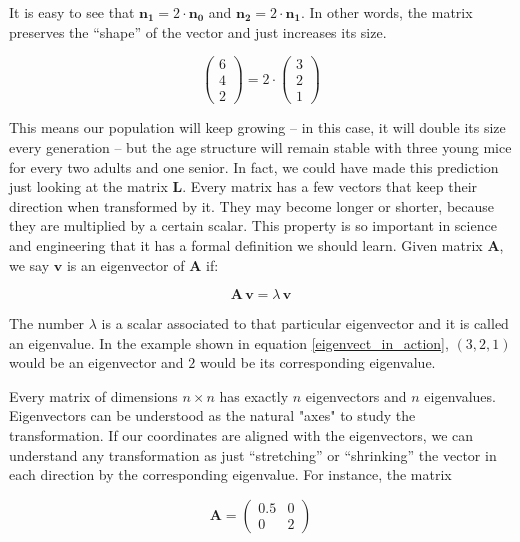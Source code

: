 \documentclass{tufte-book} %
\begin{document}
It is easy to see that $\mathbf{n_1} = 2 \cdot \mathbf{n_0}$  and $\mathbf{n_2} = 2 \cdot \mathbf{n_1}$. In other words, the matrix preserves the ``shape'' of the vector and just increases its size.

\begin{equation}
 \begin{pmatrix} 6\\ 4 \\ 2\end{pmatrix} =  2 \cdot\begin{pmatrix} 3\\ 2 \\ 1\end{pmatrix} 
 \label{eigenvect_in_action}
\end{equation}

This means our population will keep growing -- in this case, it will double its size every generation -- but the age structure will remain stable with three young mice for every two adults and one senior. In fact, we could have made this prediction just looking at the matrix $\mathbf{L}$. Every matrix has a few vectors that keep their direction when transformed by it. They may become longer or shorter, because they are multiplied by a certain scalar. This property is so important in science and engineering that it has a formal definition we should learn. Given matrix $\mathbf{A}$, we say $\mathbf{v}$ is an eigenvector of  $\mathbf{A}$ if:
 
\begin{equation}
	\label{eigendefinition}
	\mathbf{A} \, \mathbf{v}  = \lambda  \,	\mathbf{v}   
\end{equation}

The number $\lambda$ is a scalar associated to that particular eigenvector and it is called an eigenvalue. In the example shown in equation \ref{eigenvect_in_action}, $(3,2,1)$ would be an eigenvector and $2$ would be its corresponding eigenvalue.

Every matrix of dimensions $n \times n$ has exactly $n$ eigenvectors and $n$ eigenvalues. Eigenvectors can be understood as the natural "axes" to study the transformation. If our coordinates are aligned with the eigenvectors, we can understand any transformation as just ``stretching'' or ``shrinking'' the vector in each direction by the corresponding eigenvalue. For instance, the matrix

\begin{equation}
	\mathbf{A}=\begin{pmatrix} 0.5 & 0\\ 0 &  2 \end{pmatrix} 
\end{equation}
\end{document}

